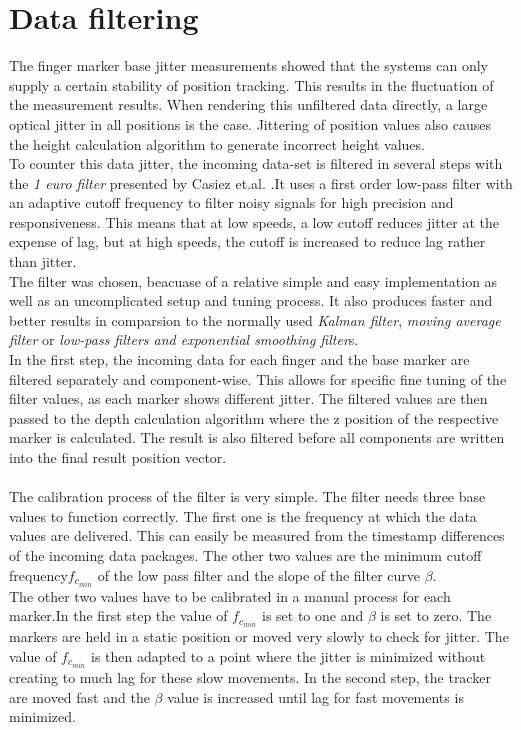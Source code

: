 \section{Data filtering}
The finger marker base jitter measurements showed that the systems can only supply a certain stability of position tracking. This results in the fluctuation of the measurement results. When rendering this unfiltered data directly, a large optical jitter in all positions is the case. Jittering of position values also causes the height calculation algorithm to generate incorrect height values.\\
To counter this data jitter, the incoming data-set is filtered in several steps with the \textit{1 euro filter} presented by Casiez et.al. \cite{Casiez.2012}.It uses a first order low-pass filter with an adaptive cutoff frequency to filter noisy signals for high precision and responsiveness. This means that at low speeds, a low cutoff reduces jitter at the expense of lag, but at high speeds, the cutoff is increased to reduce lag rather than jitter.\\
\newpage The filter was chosen, beacuase of a relative simple and easy implementation as well as an uncomplicated setup and tuning process. It also produces faster and better results in comparsion to the normally used \textit{Kalman filter}\cite{Welch.2001}, \textit{moving average filter} or \textit{low-pass filters and exponential smoothing filter}s\cite{LaViola.2003}.
\\ In the first step, the incoming data for each finger and the base marker  are filtered separately and component-wise. This allows for specific fine tuning of the filter values, as each marker shows different jitter. The filtered values are then passed to the depth calculation algorithm where the z position of the respective marker is calculated. The result is also filtered before all components are written into the final result position vector.
\\\\The calibration process of the filter is very simple. The filter needs three base values to function correctly. The first one is the frequency at which the data values are delivered. This can easily be measured from the timestamp differences of the incoming data packages. The other two values are the minimum cutoff frequency$f_{c_{min}} $ of the low pass filter and the slope of the filter curve $\beta$.
\\The other two values have to be calibrated in a manual process for each marker.In the first step the value of $f_{c_{min}} $ is set to one and $\beta$ is set to zero. The markers are held in a static position or moved very slowly to check for jitter. The value of $f_{c_{min}} $ is then adapted to a point where the jitter is minimized without creating to much lag for these slow movements. In the second step, the tracker are moved fast and the $\beta$ value is increased until lag for fast movements is minimized.
